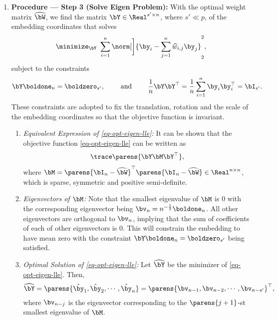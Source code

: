 \documentclass[12pt]{article}
\begin{document}
\begin{enumerate}[label=\textbf{\arabic*.}]
	\item \textbf{Procedure --- Step 3 (Solve Eigen Problem):} With the optimal weight matrix $\widehat{\bW}$, we find the matrix $\bY \in \Real^{s' \times n}$, where $s' \ll p$, of the embedding coordinates that solves 
	\begin{align}\label{eq-opt-eigen-lle}
		\minimize_{\bY} \ \sum_{i=1}^n \norm[\bigg]{\by_i - \sum_{j=1}^n \widehat{w}_{i,j} \by_j}_2^2, 
	\end{align}
	subject to the constraints 
	\begin{align*}
		\bY \boldone_n = \boldzero_{s'}, \qquad \text{ and } \qquad \frac{1}{n} \bY \bY^\top = \frac{1}{n} \sum_{i=1}^n \by_i \by_i^\top = \bI_{s'}. 
	\end{align*}
	These constraints are adopted to fix the translation, rotation and the scale of the embedding coordinates so that the objective function is invariant. 
	
	\begin{enumerate}
		\item \textit{Equivalent Expression of \eqref{eq-opt-eigen-lle}:} It can be shown that the objective function \eqref{eq-opt-eigen-lle} can be written as 
		\begin{align*}
			\trace \parens{\bY \bM \bY^\top}, 
		\end{align*}
		where $\bM = \parens{\bI_n - \widehat{\bW}}^\top \parens{\bI_n - \widehat{\bW}} \in \Real^{n \times n}$, which is sparse, symmetric and positive semi-definite. 
		
		\item \textit{Eigenvectors of $\bM$:} Note that the smallest eigenvalue of $\bM$ is 0 with the corresponding eigenvector being $\bv_n = n^{-\frac{1}{2}} \boldone_n$. All other eigenvectors are orthogonal to $\bv_n$, implying that the sum of coefficients of each of other eigenvectors is 0. This will constrain the embedding to have mean zero with the constraint $\bY \boldone_n = \boldzero_{s'}$ being satisfied. 
		
		\item \textit{Optimal Solution of \eqref{eq-opt-eigen-lle}:} Let $\widehat{\bY}$ be the minimizer of \eqref{eq-opt-eigen-lle}. Then, 
		\begin{align*}
			\widehat{\bY} = \parens{\hat{\by}_1, \hat{\by}_2, \cdots, \hat{\by}_n} = \parens{\bv_{n-1}, \bv_{n-2}, \cdots, \bv_{n-s'}}^\top, 
		\end{align*}
		where $\bv_{n-j}$ is the eigenvector corresponding to the $\parens{j + 1}$-st smallest eigenvalue of $\bM$. 
		

\end{enumerate}
\end{enumerate}
\end{document}
